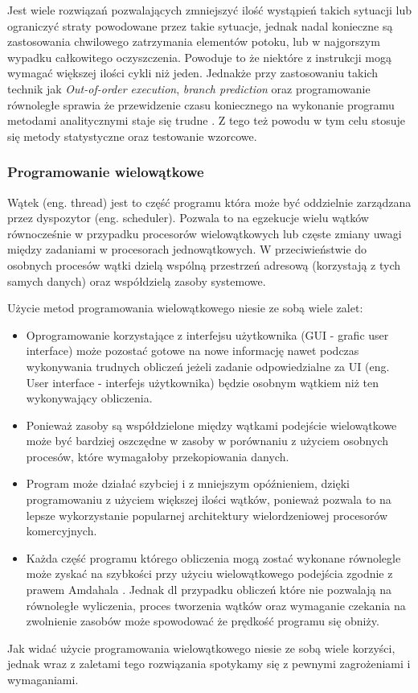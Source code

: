 Jest wiele rozwiązań pozwalających zmniejszyć ilość wystąpień takich sytuacji lub ograniczyć straty powodowane przez takie sytuacje, jednak nadal konieczne są zastosowania chwilowego zatrzymania elementów potoku, lub w najgorszym wypadku całkowitego oczyszczenia.
Powoduje to że niektóre z instrukcji mogą wymagać większej ilości cykli niż jeden. Jednakże przy zastosowaniu takich technik jak
\textit{Out-of-order execution}, \textit{branch prediction} oraz programowanie równoległe  sprawia że przewidzenie czasu koniecznego na wykonanie programu metodami analitycznymi staje się trudne . 
Z tego też powodu w tym celu stosuje się metody statystyczne oraz testowanie wzorcowe. 

\subsubsection{Programowanie wielowątkowe}

Wątek (eng. thread) jest to część programu która może być oddzielnie zarządzana przez dyspozytor (eng. scheduler). 
Pozwala to na egzekucje wielu wątków równocześnie w przypadku procesorów wielowątkowych lub częste zmiany uwagi między zadaniami w procesorach jednowątkowych.
W przeciwieństwie do osobnych procesów wątki dzielą wspólną przestrzeń adresową (korzystają z tych samych danych) oraz współdzielą zasoby systemowe.

Użycie metod programowania wielowątkowego niesie ze sobą wiele zalet:
\begin{itemize}
        \item Oprogramowanie korzystające z interfejsu użytkownika (GUI - grafic user interface) może pozostać gotowe na nowe informację nawet podczas wykonywania trudnych obliczeń jeżeli zadanie odpowiedzialne za UI (eng. User interface - interfejs użytkownika) będzie osobnym wątkiem niż ten wykonywający obliczenia.
        \item Ponieważ zasoby są współdzielone między wątkami podejście wielowątkowe może być bardziej oszczędne w zasoby w porównaniu z użyciem osobnych procesów, które wymagałoby przekopiowania danych.
        \item Program może działać szybciej i z mniejszym opóźnieniem, dzięki programowaniu z użyciem większej ilości wątków, ponieważ pozwala to na lepsze wykorzystanie popularnej architektury wielordzeniowej procesorów komercyjnych. 
        \item Każda część programu którego obliczenia mogą zostać wykonane równolegle może zyskać na szybkości przy użyciu wielowątkowego podejścia zgodnie z prawem Amdahala \cite{arch}. 
        Jednak dl przypadku obliczeń które nie pozwalają na równoległe wyliczenia, proces tworzenia wątków oraz wymaganie czekania na zwolnienie zasobów może spowodować że prędkość programu się obniży.
\end{itemize}
Jak widać użycie programowania wielowątkowego niesie ze sobą wiele korzyści,
jednak wraz z zaletami tego rozwiązania spotykamy się z pewnymi zagrożeniami i wymaganiami.

